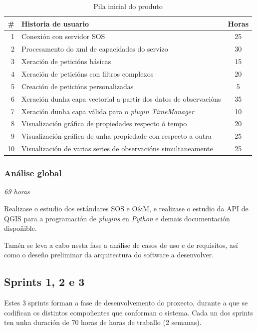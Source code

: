 \begin{table}
\centering
\begin{tabularx}{\textwidth}{rXc} \toprule
	\# & Historia de usuario & Horas \\
	\midrule
	1 & Conexión con servidor SOS & 25 \\
	2 & Procesamento do xml de capacidades do servizo & 30 \\
	3 & Xeración de peticións básicas & 15 \\
	4 & Xeración de peticións con filtros complexos & 20 \\
	5 & Creación de peticións personalizadas & 5 \\
	6 & Xeración dunha capa vectorial a partir dos datos de observacións & 35\\
	7 & Xeración dunha capa válida para o \emph{plugin} \emph{TimeManager} & 10\\
	8 & Visualización gráfica de propiedades respecto ó tempo & 20\\
	9 & Visualización gráfica de unha propiedade con respecto a outra & 25\\
	10 & Visualización de varias series de observacións simultaneamente & 25\\
	\bottomrule
\end{tabularx}
\caption{Pila inicial do produto}
\label{tab:productBacklog}
\end{table}

\subsubsection{Análise global}
\textit{69 horas}

Realizase o estudio dos estándares SOS e O\&M, e realizase o estudio da API de QGIS\cite{APIQGIS} para a programación de \emph{plugins} en \emph{Python} e demais documentación dispoñible\cite{PyQGIS}.

Tamén se leva a cabo nesta fase a análise de casos de uso e de requisitos, así como o deseño preliminar da arquitectura do software a desenvolver.

\subsection{Sprints 1, 2 e 3}
Estes 3 sprints forman a fase de desenvolvemento do proxecto, durante a que se codifican os distintos compoñentes que conforman o sistema. Cada un dos sprints ten unha duración de 70 horas de horas de traballo (2 semanas).

